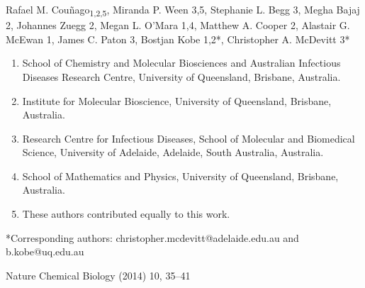 Rafael M. Couñago\textsubscript{1,2,5}, Miranda P. Ween 3,5, Stephanie L. Begg 3, Megha Bajaj 2, Johannes Zuegg 2, Megan L. O’Mara 1,4, Matthew A. Cooper 2, Alastair G. McEwan 1, James C. Paton 3, Bostjan Kobe 1,2*, Christopher A. McDevitt 3*
\begin{enumerate}
\item School of Chemistry and Molecular Biosciences and Australian Infectious Diseases Research Centre, University of Queensland, Brisbane, Australia.
\item Institute for Molecular Bioscience, University of Queensland, Brisbane, Australia.
\item Research Centre for Infectious Diseases, School of Molecular and Biomedical Science, University of Adelaide, Adelaide, South Australia, Australia.
\item School of Mathematics and Physics, University of Queensland, Brisbane, Australia.
\item These authors contributed equally to this work.
\end{enumerate}

*Corresponding authors: christopher.mcdevitt@adelaide.edu.au and b.kobe@uq.edu.au

Nature Chemical Biology (2014) 10, 35–41